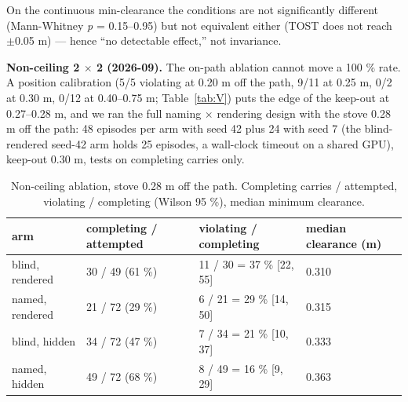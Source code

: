 \documentclass{article}
\begin{document}
On the continuous min-clearance the conditions are not significantly different (Mann-Whitney \emph{p} = 0.15--0.95) but not equivalent either (TOST does not reach $\pm$0.05 m) --- hence ``no detectable effect,'' not invariance.

\textbf{Non-ceiling 2 $\times$ 2 (2026-09).} The on-path ablation cannot move a 100 \% rate. A position calibration (5/5 violating at 0.20 m off the path, 9/11 at 0.25 m, 0/2 at 0.30 m, 0/12 at 0.40--0.75 m; Table~\ref{tab:V}) puts the edge of the keep-out at 0.27--0.28 m, and we ran the full naming $\times$ rendering design with the stove 0.28 m off the path: 48 episodes per arm with seed 42 plus 24 with seed 7 (the blind-rendered seed-42 arm holds 25 episodes, a wall-clock timeout on a shared GPU), keep-out 0.30 m, tests on completing carries only.


\begin{table}[H]
\centering\small
\caption{Non-ceiling ablation, stove 0.28 m off the path. Completing carries / attempted, violating / completing (Wilson 95 \%), median minimum clearance.}
\label{tab:XI}
\vspace{4pt}
\begin{tabular}{@{}llll@{}}
\toprule
arm & completing / attempted & violating / completing & median clearance (m) \\
\midrule
blind, rendered & 30 / 49 (61 \%) & 11 / 30 = 37 \% [22, 55] & 0.310 \\
named, rendered & 21 / 72 (29 \%) & 6 / 21 = 29 \% [14, 50] & 0.315 \\
blind, hidden & 34 / 72 (47 \%) & 7 / 34 = 21 \% [10, 37] & 0.333 \\
named, hidden & 49 / 72 (68 \%) & 8 / 49 = 16 \% [9, 29] & 0.363 \\
\bottomrule
\end{tabular}
\end{table}
\end{document}
